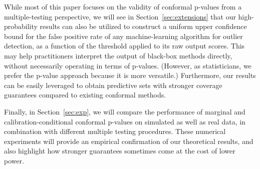 \documentclass[11pt]{article}
\def\Chat{\hat{\mathcal{C}}}
\begin{document}
While most of this paper focuses on the validity of conformal p-values from a multiple-testing perspective, we will see in Section~\ref{sec:extensions} that our high-probability results can also be utilized to construct a uniform upper confidence bound for the false positive rate of any machine-learning algorithm for outlier detection, as a function of the threshold applied to its raw output scores. This may help practitioners interpret the output of black-box methods directly, without necessarily operating in terms of p-values. (However, as statisticians, we prefer the p-value approach because it is more versatile.)
Furthermore, our results can be easily leveraged to obtain predictive sets with stronger coverage guarantees compared to existing conformal methods.

Finally, in Section~\ref{sec:exp}, we will compare the performance of marginal and calibration-conditional conformal p-values on simulated as well as real data, in combination with different multiple testing procedures. These numerical experiments will provide an empirical confirmation of our theoretical results, and also highlight how stronger guarantees sometimes come at the cost of lower power.


\end{document}
